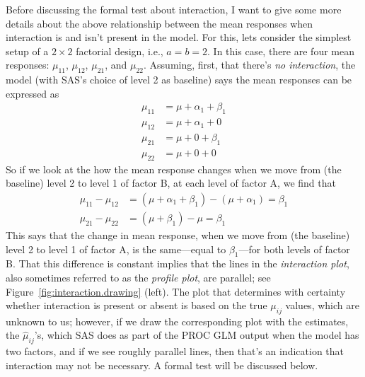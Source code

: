 \documentclass[a4paper, 12pt]{article}
\theoremstyle{plain}
\theoremstyle{definition}
\theoremstyle{remark}
\begin{document}
Before discussing the formal test about interaction, I want to give some more details about the above relationship between the mean responses when interaction is and isn't present in the model.  For this, lets consider the simplest setup of a $2 \times 2$ factorial design, i.e., $a=b=2$.  In this case, there are four mean responses: $\mu_{11}$, $\mu_{12}$, $\mu_{21}$, and $\mu_{22}$.  Assuming, first, that there's {\em no interaction}, the model (with SAS's choice of level 2 as baseline) says the mean responses can be expressed as 
\begin{align*}
\mu_{11} & = \mu + \alpha_1 + \beta_1 \\
\mu_{12} & = \mu + \alpha_1 + 0\\
\mu_{21} & = \mu + 0 + \beta_1 \\
\mu_{22} & = \mu + 0 + 0
\end{align*}
So if we look at the how the mean response changes when we move from (the baseline) level 2 to level 1 of factor B, at each level of factor A, we find that 
\begin{align}
\mu_{11} - \mu_{12} & = (\mu + \alpha_1 + \beta_1) - (\mu +\alpha_1) = \beta_1 \tag{$B=1$} \\
\mu_{21} - \mu_{22} & = (\mu + \beta_1) - \mu = \beta_1 \tag{$B=2$}
\end{align}
This says that the change in mean response, when we move from (the baseline) level 2 to level 1 of factor A, is the same---equal to $\beta_1$---for both levels of factor B.  That this difference is constant implies that the lines in the {\em interaction plot}, also sometimes referred to as the {\em profile plot}, are parallel; see Figure~\ref{fig:interaction.drawing} (left).  The plot that determines with certainty whether interaction is present or absent is based on the true $\mu_{ij}$ values, which are unknown to us; however, if we draw the corresponding plot with the estimates, the $\hat\mu_{ij}$'s, which SAS does as part of the PROC GLM output when the model has two factors, and if we see roughly parallel lines, then that's an indication that interaction may not be necessary.  A formal test will be discussed below.  
\end{document}
